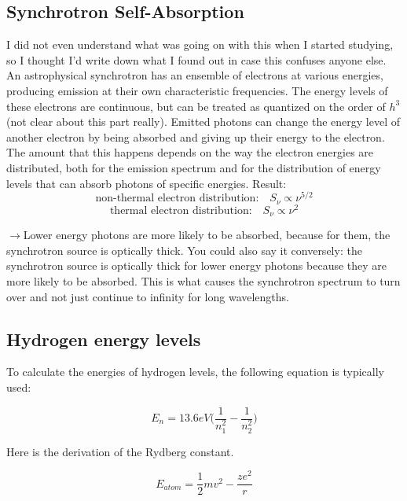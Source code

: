 \subsection{Synchrotron Self-Absorption}
	I did not even understand what was going on with this when I started studying, so I thought I'd write down what I found out in case this confuses anyone else.
	An astrophysical synchrotron has an ensemble of electrons at various energies, producing emission at their own characteristic frequencies. The energy levels of these electrons are continuous, but can be treated as quantized on the order of $h^{3}$ (not clear about this part really). Emitted photons can change the energy level of another electron by being absorbed and giving up their energy to the electron.
	The amount that this happens depends on the way the electron energies are distributed, both for the emission spectrum and for the distribution of energy levels that can absorb photons of specific energies.
	Result:
	\begin{equation}
	\text{non-thermal electron distribution:} \quad S_{\nu} \propto \nu^{5/2}		
	\end{equation}
	\begin{equation}
	\text{thermal electron distribution:} \quad S_{\nu} \propto \nu^{2}		
	\end{equation}
	
	$\rightarrow$Lower energy photons are more likely to be absorbed, because for them, the synchrotron source is optically thick. You could also say it conversely: the synchrotron source is optically thick for lower energy photons because they are more likely to be absorbed. This is what causes the synchrotron spectrum to turn over and not just continue to infinity for long wavelengths.

\subsection{Hydrogen energy levels}

To calculate the energies of hydrogen levels, the following equation is typically used:

\begin{equation}
E_n = 13.6eV\big(\frac{1}{n_1^2} - \frac{1}{n_2^2}\big)
\end{equation}

Here is the derivation of the Rydberg constant.

\begin{equation}
E_{atom} = \frac{1}{2}mv^2 - \frac{ze^2}{r}
\end{equation}

